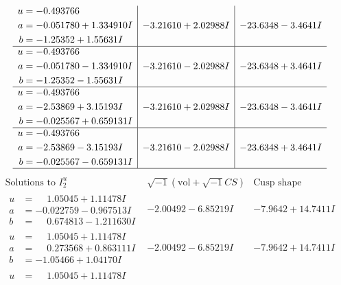 \documentclass[1p]{elsarticle_modified}
\theoremstyle{definition}
\newcommand{\I}{\sqrt{-1}}
\begin{document}
$$\begin{array}{c|c|c}
\begin{aligned}
u &= -0.493766\phantom{ +0.000000I} \\
a &= -0.051780 + 1.334910 I \\
b &= -1.25352 + 1.55631 I\end{aligned}
 & -3.21610 + 2.02988 I & -23.6348 - 3.4641 I \\ \hline\begin{aligned}
u &= -0.493766\phantom{ +0.000000I} \\
a &= -0.051780 - 1.334910 I \\
b &= -1.25352 - 1.55631 I\end{aligned}
 & -3.21610 - 2.02988 I & -23.6348 + 3.4641 I \\ \hline\begin{aligned}
u &= -0.493766\phantom{ +0.000000I} \\
a &= -2.53869 + 3.15193 I \\
b &= -0.025567 + 0.659131 I\end{aligned}
 & -3.21610 + 2.02988 I & -23.6348 - 3.4641 I \\ \hline\begin{aligned}
u &= -0.493766\phantom{ +0.000000I} \\
a &= -2.53869 - 3.15193 I \\
b &= -0.025567 - 0.659131 I\end{aligned}
 & -3.21610 - 2.02988 I & -23.6348 + 3.4641 I\\
 \hline 
 \end{array}$$\newpage$$\begin{array}{c|c|c}  
\text{Solutions to }I^u_{2}& \I (\text{vol} + \sqrt{-1}CS) & \text{Cusp shape}\\
 \hline 
\begin{aligned}
u &= \phantom{-}1.05045 + 1.11478 I \\
a &= -0.022759 - 0.967513 I \\
b &= \phantom{-}0.674813 - 1.211630 I\end{aligned}
 & -2.00492 - 6.85219 I & -7.9642 + 14.7411 I \\ \hline\begin{aligned}
u &= \phantom{-}1.05045 + 1.11478 I \\
a &= \phantom{-}0.273568 + 0.863111 I \\
b &= -1.05466 + 1.04170 I\end{aligned}
 & -2.00492 - 6.85219 I & -7.9642 + 14.7411 I \\ \hline\begin{aligned}
u &= \phantom{-}1.05045 + 1.11478 I \\

\end{aligned}
\end{array}$$
\end{document}
